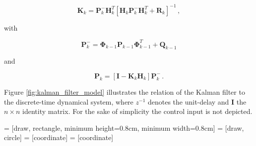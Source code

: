 \begin{equation}\label{eq:Kalman_gain}
  \mathbf{K}_{k} = \mathbf{P}^-_k \mathbf{H}^T_k[\mathbf{H}_k \mathbf{P}^-_k \mathbf{H}^T_k + \mathbf{R}_k]^{-1}\,,
\end{equation}

\noindent
with

\begin{equation}\label{eq:apriori_error_cov}
  \mathbf{P}^-_{k} = \bm{\Phi}_{k-1} \mathbf{P}_{k-1} \bm{\Phi}^T_{k-1} + \mathbf{Q}_{k-1}
\end{equation}

\noindent
and

\begin{equation}\label{eq:aposteriori_error_cov}
  \mathbf{P}_{k} = [\mathbf{I} - \mathbf{K}_{k}\mathbf{H}_{k}]\mathbf{P}^-_{k}\,.
\end{equation}

\noindent
Figure \ref{fig:kalman_filter_model} illustrates the relation of the Kalman filter to the discrete-time dynamical system, where $z^{-1}$ denotes the unit-delay and $\mathbf{I}$ the $n\times n$ identity matrix. For the sake of simplicity the control input is not depicted.

 = [draw, rectangle, minimum height=0.8cm, minimum width=0.8cm]
 = [draw, circle]
 = [coordinate]
 = [coordinate]


